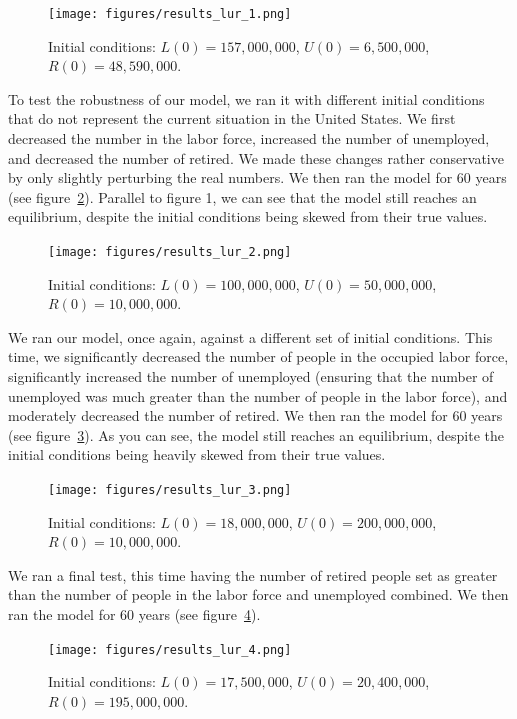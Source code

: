 \documentclass[11pt]{amsart}
\begin{document}
\begin{figure}[h]
    \centering
    \texttt{[image: figures/results\_lur\_1.png]}
    \caption{Initial conditions: $L(0) = 157,000,000$, $U(0) = 6,500,000$, $R(0) = 48,590,000$.}
    \label{fig:results_lur_1}
\end{figure}

To test the robustness of our model, we ran it with different initial conditions that do not represent the current situation in the United States. 
We first decreased the number in the labor force, increased the number of unemployed, and decreased the number of retired. We made these changes rather conservative
by only slightly perturbing the real numbers. We then ran the model for 60 years (see figure~\ref{fig:results_lur_2}).
Parallel to figure 1, we can see that the model still reaches an equilibrium, despite the initial conditions being skewed from their true values.

\begin{figure}[h]
    \centering
    \texttt{[image: figures/results\_lur\_2.png]}
    \caption{Initial conditions: $L(0) = 100,000,000$, $U(0) = 50,000,000$, $R(0) = 10,000,000$.}
    \label{fig:results_lur_2}
\end{figure}

\newpage


We ran our model, once again, against a different set of initial conditions. This time, we significantly decreased the number of people in the occupied
labor force, significantly increased the number of unemployed (ensuring that the number of unemployed was much greater than the number of people in the labor force), and moderately decreased the number of retired. We then ran the model for 60 years (see figure~\ref{fig:results_lur_3}).
As you can see, the model still reaches an equilibrium, despite the initial conditions being heavily skewed from their true values.

\begin{figure}[h]
    \centering
    \texttt{[image: figures/results\_lur\_3.png]}
    \caption{Initial conditions: $L(0) = 18,000,000$, $U(0) = 200,000,000$, $R(0) = 10,000,000$.}
    \label{fig:results_lur_3}
\end{figure}

We ran a final test, this time having the number of retired people set as greater than the number of
people in the labor force and unemployed combined. We then ran the model for 60 years (see figure~\ref{fig:results_lur_4}).

\begin{figure}[h]
    \centering
    \texttt{[image: figures/results\_lur\_4.png]}
    \caption{Initial conditions: $L(0) = 17,500,000$, $U(0) = 20,400,000$, $R(0) = 195,000,000$.}
    \label{fig:results_lur_4}
\end{figure}
\end{document}
